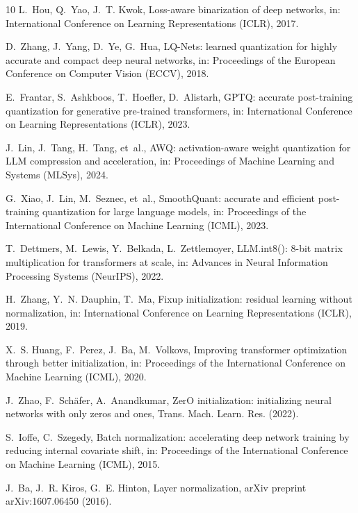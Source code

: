 \documentclass[final,5p,times,twocolumn]{elsarticle}
\theoremstyle{remark}
\begin{document}
\begin{thebibliography}{10}
L.~Hou, Q.~Yao, J.~T. Kwok, {Loss-aware binarization of deep networks}, in:
  International Conference on Learning Representations (ICLR), 2017.

D.~Zhang, J.~Yang, D.~Ye, G.~Hua, {LQ-Nets: learned quantization for highly
  accurate and compact deep neural networks}, in: Proceedings of the European
  Conference on Computer Vision (ECCV), 2018.

E.~Frantar, S.~Ashkboos, T.~Hoefler, D.~Alistarh, {GPTQ: accurate post-training
  quantization for generative pre-trained transformers}, in: International
  Conference on Learning Representations (ICLR), 2023.

J.~Lin, J.~Tang, H.~Tang, et~al., {AWQ: activation-aware weight quantization
  for LLM compression and acceleration}, in: Proceedings of Machine Learning
  and Systems (MLSys), 2024.

G.~Xiao, J.~Lin, M.~Seznec, et~al., {SmoothQuant: accurate and efficient
  post-training quantization for large language models}, in: Proceedings of the
  International Conference on Machine Learning (ICML), 2023.

T.~Dettmers, M.~Lewis, Y.~Belkada, L.~Zettlemoyer, {LLM.int8(): 8-bit matrix
  multiplication for transformers at scale}, in: Advances in Neural Information
  Processing Systems (NeurIPS), 2022.

H.~Zhang, Y.~N. Dauphin, T.~Ma, {Fixup initialization: residual learning
  without normalization}, in: International Conference on Learning
  Representations (ICLR), 2019.

X.~S. Huang, F.~Perez, J.~Ba, M.~Volkovs, {Improving transformer optimization
  through better initialization}, in: Proceedings of the International
  Conference on Machine Learning (ICML), 2020.

J.~Zhao, F.~Sch{\"a}fer, A.~Anandkumar, {ZerO initialization: initializing
  neural networks with only zeros and ones}, Trans. Mach. Learn. Res. (2022).

S.~Ioffe, C.~Szegedy, {Batch normalization: accelerating deep network training
  by reducing internal covariate shift}, in: Proceedings of the International
  Conference on Machine Learning (ICML), 2015.

J.~Ba, J.~R. Kiros, G.~E. Hinton, {Layer normalization}, arXiv preprint
  arXiv:1607.06450 (2016).


\end{thebibliography}
\end{document}
